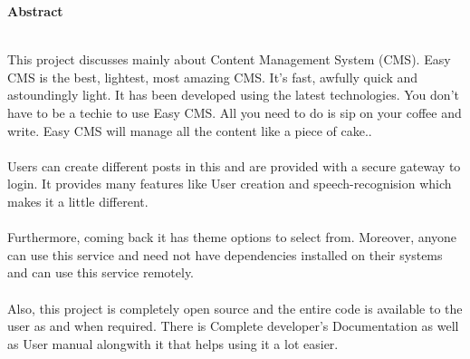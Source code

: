 \begin{center}
{\Huge \bf{Abstract}\vskip 0.2in}
\end{center}
 \hrulefill \\

This project discusses mainly about Content Management System (CMS). Easy CMS is the best, lightest, most amazing CMS. It's fast, awfully quick and astoundingly light. It has been developed using the latest technologies. You don't have to be a techie to use Easy CMS. All you need to do is sip on your coffee and write. Easy CMS will manage all the content like a piece of cake..\\\\
Users can create different posts in this and are provided with a secure gateway to login. It provides many features like User creation and speech-recognision which makes it a little different.\\\\
Furthermore, coming back it has theme options to select from. Moreover, anyone can use this service and need not have dependencies installed on their systems and can use this service remotely.\\\\
Also, this project is completely open source and the entire code is available 
to the user as and when required. There is Complete developer's 
Documentation as well as User manual alongwith it that helps using it a lot easier.


